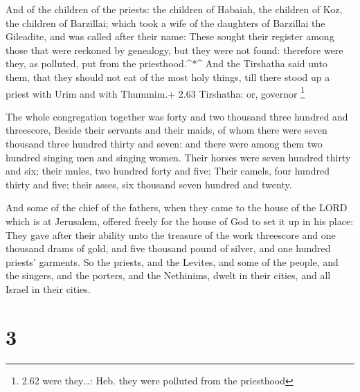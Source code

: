  And of the children of the priests: the children of
Habaiah, the children of Koz, the children of Barzillai; which took a
wife of the daughters of Barzillai the Gileadite, and was called after
their name:  These sought their register among those that
were reckoned by genealogy, but they were not found: therefore were
they, as polluted, put from the priesthood.\^{}*\^{}  And
the Tirshatha said unto them, that they should not eat of the most holy
things, till there stood up a priest with Urim and with Thummim.+ 2.63
Tirshatha: or, governor \footnote{2.62 were they\ldots: Heb. they were
  polluted from the priesthood}

 The whole congregation together was forty and two thousand
three hundred and threescore,  Beside their servants and
their maids, of whom there were seven thousand three hundred thirty and
seven: and there were among them two hundred singing men and singing
women.  Their horses were seven hundred thirty and six;
their mules, two hundred forty and five;  Their camels,
four hundred thirty and five; their asses, six thousand seven hundred
and twenty.

 And some of the chief of the fathers, when they came to
the house of the LORD which is at Jerusalem, offered freely for the
house of God to set it up in his place:  They gave after
their ability unto the treasure of the work threescore and one thousand
drams of gold, and five thousand pound of silver, and one hundred
priests' garments.  So the priests, and the Levites, and
some of the people, and the singers, and the porters, and the Nethinims,
dwelt in their cities, and all Israel in their cities.

\hypertarget{section-2}{%
\section{3}\label{section-2}}

